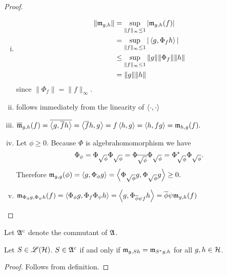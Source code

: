 \begin{proof}
 \begin{enumerate}[(i)]
  \item \begin{align*}
         \| \mathfrak{m}_{g,h} \| &= \sup\limits_{\| f \| _\infty \leq 1} | \mathfrak{m}_{g,h}(f) | \\
			&= \sup\limits_{\| f \| _\infty \leq 1} | \left\langle g, \Phi_f h \right\rangle | \\
			&\leq \sup\limits_{\| f \| _\infty \leq 1} \| g \| \|\Phi_f \| \| h\| \\
			&= \|g\| \|h\|
        \end{align*}
  since $\|\Phi_f \| =\| f \|_\infty$.
 \item follows immediately from the linearity of $\left\langle \cdot , \cdot \right\rangle$
 
 \item $\overline{\mathfrak{m}}_{g,h}(f) = \overline{\left\langle g, \overline{f}h \right\rangle} = 
       \left\langle \overline{f}h ,g \right\rangle =	f\left\langle h,g \right\rangle = \left\langle h, fg \right\rangle = \mathfrak{m}_{h,g}(f).$
	
 \item Let $\phi \geq 0$. Because $\Phi$ is algebrahomomorphism we have 
	\[
	  \Phi_\phi = \Phi_{\sqrt{\phi}} \Phi_{\sqrt{\phi}} = 
	  \Phi_{\overline{\sqrt{\phi}}} \Phi_{\sqrt{\phi}} =
	  \Phi_{\sqrt{\phi}}^{*} \Phi_{\sqrt{\phi}}.
	\]
	Therefore $\mathfrak{m}_{g,g}(\phi) = \left\langle g, \Phi_\phi g \right\rangle = \left\langle \Phi_{\sqrt{\phi}}g,
	\Phi_{\sqrt{\phi}}g \right\rangle \geq 0. $
	
 \item	$\mathfrak{m}_{\Phi_\phi g, \Phi_\psi h} (f ) = \left\langle \Phi_\phi g, \Phi_f 
	\Phi_\psi h \right\rangle = \left\langle g , \Phi_{\overline{\phi} \psi f} h  \right\rangle = \overline{\phi}
	\psi \mathfrak{m}_{g,h}(f)$ 

\end{enumerate}

\end{proof}

Let $\mathfrak{A} ^c $ denote the commutant of $\mathfrak{A}$.

\begin{lem}
 Let $S \in \mathscr{L}(\mathcal{H})$. $S \in \mathfrak{A} ^c$ if and only if $\mathfrak{m}_{g, Sh} = \mathfrak{m}_{S ^{*} g, h}$ 
 for all $g, h \in \mathcal{H}$. 
\end{lem}

\begin{proof}
 Follows from definition.
\end{proof}

